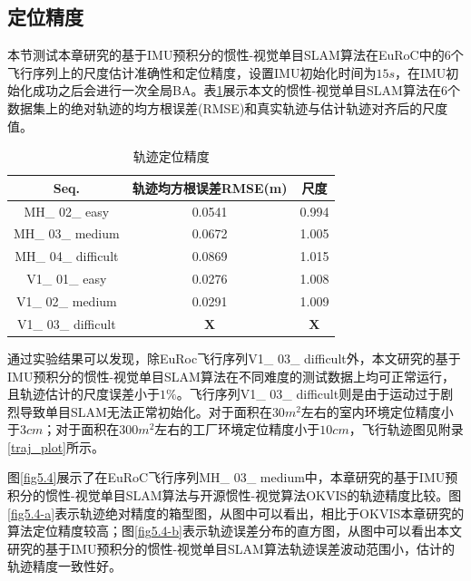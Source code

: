 \subsection{定位精度}
本节测试本章研究的基于IMU预积分的惯性-视觉单目SLAM算法在EuRoC中的6个飞行序列上的尺度估计准确性和定位精度，设置IMU初始化时间为$15s$，在IMU初始化成功之后会进行一次全局BA。表\ref{tab5.1}展示本文的惯性-视觉单目SLAM算法在6个数据集上的绝对轨迹的均方根误差(RMSE)和真实轨迹与估计轨迹对齐后的尺度值。

\begin{table}[h]	%
\renewcommand\arraystretch{1}		%
\centering
\caption{轨迹定位精度}   %
\label{tab5.1}
	\begin{tabular*}{0.9\textwidth}{@{\extracolsep{\fill}}ccc}  %
	\toprule
	Seq. &轨迹均方根误差RMSE(m) &尺度 \\
	\midrule
	MH\_ 02\_ easy 			&0.0541				&0.994				\\
	MH\_ 03\_ medium		&0.0672 			&1.005 				\\
	MH\_ 04\_ difficult		&0.0869				&1.015				\\
	V1\_ 01\_ easy 			&0.0276				&1.008 				\\
	V1\_ 02\_ medium		&0.0291				&1.009 				\\
	V1\_ 03\_ difficult		&$\boldsymbol{X}$	&$\boldsymbol{X}$	\\			
	\bottomrule
	\end{tabular*}
\end{table}

通过实验结果可以发现，除EuRoc飞行序列V1\_ 03\_ difficult外，本文研究的基于IMU预积分的惯性-视觉单目SLAM算法在不同难度的测试数据上均可正常运行，且轨迹估计的尺度误差小于$1\%$。飞行序列V1\_ 03\_ difficult则是由于运动过于剧烈导致单目SLAM无法正常初始化。对于面积在$30 m^2$左右的室内环境定位精度小于$3cm$；对于面积在$300m^2$左右的工厂环境定位精度小于$10cm$，飞行轨迹图见附录\ref{traj_plot}所示。

图\ref{fig5.4}展示了在EuRoC飞行序列MH\_ 03\_ medium中，本章研究的基于IMU预积分的惯性-视觉单目SLAM算法与开源惯性-视觉算法OKVIS的轨迹精度比较。图\ref{fig5.4-a}表示轨迹绝对精度的箱型图，从图中可以看出，相比于OKVIS本章研究的算法定位精度较高；图\ref{fig5.4-b}表示轨迹误差分布的直方图，从图中可以看出本文研究的基于IMU预积分的惯性-视觉单目SLAM算法轨迹误差波动范围小，估计的轨迹精度一致性好。

